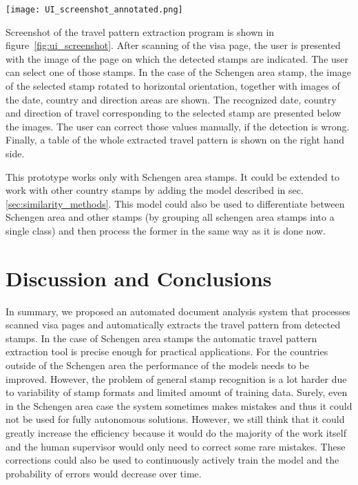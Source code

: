 \documentclass[twocolumn]{svjour3}
\begin{document}
\begin{figure*}
  \centering
  \texttt{[image: UI\_screenshot\_annotated.png]}
  \caption{Screenshot of the final travel pattern extraction program.}
  \label{fig:ui_screenshot}
\end{figure*}

Screenshot of the travel pattern extraction program is shown in figure~\ref{fig:ui_screenshot}. After scanning of the visa page, the user is presented with the image of the page on which the detected stamps are indicated. The user can select one of those stamps. In the case of the Schengen area stamp, the image of the selected stamp rotated to horizontal orientation, together with images of the date, country and direction areas are shown. The recognized date, country and direction of travel corresponding to the selected stamp are presented below the images. The user can correct those values manually, if the detection is wrong. Finally, a table of the whole extracted travel pattern is shown on the right hand side.

This prototype works only with Schengen area stamps. It could be extended to work with other country stamps by adding the model described in sec. \mbox{\ref{sec:similarity_methods}}. This model could also be used to differentiate between Schengen area and other stamps (by grouping all schengen area stamps into a single class) and then process the former in the same way as it is done now.

\section{Discussion and Conclusions}

In summary, we proposed an automated document analysis system
that processes scanned visa pages and automatically extracts the travel pattern from detected stamps. In the case of Schengen area stamps the automatic travel pattern extraction tool is precise enough for practical applications. For the countries outside of the Schengen area the performance of the models needs to be improved. However, the problem of general stamp recognition is a lot harder due to variability of stamp formats and limited amount of training data. Surely, even in the Schengen area case the system sometimes makes mistakes and thus it could not be used for fully autonomous solutions. However, we still think that it could greatly increase the efficiency because it would do the majority of the work itself and the human supervisor would only need to correct some rare mistakes. These corrections could also be used to continuously actively train the model and the probability of errors would decrease over time.
\end{document}
